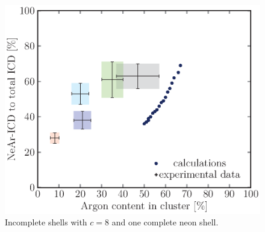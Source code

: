 \begin{figure}[!h]
\begin{minipage}{0.48\textwidth}
    \centering
    \includegraphics[scale=0.5]{pics/incompl01_08.ps}
    \caption{Incomplete shells with $c=8$ and one complete neon shell.}
    \label{incompl01_08}
\end{minipage}
\hfill
\begin{minipage}{0.48\textwidth}
    \centering
\end{minipage}
\end{figure}

\FloatBarrier


